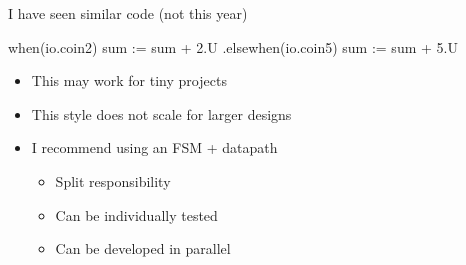 \begin{frame}[fragile]{I have seen similar code (not this year)}
\begin{chisel}
  when(io.coin2) {
    sum := sum + 2.U
  } .elsewhen(io.coin5) {
    sum := sum + 5.U
  }
\end{chisel}
\begin{itemize}
\item This may work for tiny projects
\item This style does not scale for larger designs
\item I recommend using an FSM + datapath
\begin{itemize}
\item Split responsibility
\item Can be individually tested
\item Can be developed in parallel
\end{itemize}
\end{itemize}
\end{frame}
%
%




